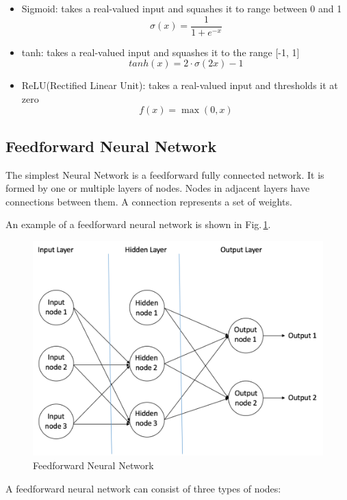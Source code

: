 \begin{itemize}
  \item Sigmoid: takes a real-valued input and squashes it to range between 0 and 1
        $$ \sigma(x) =  \frac{\mathrm{1} }{\mathrm{1} + e^{-x} }  $$ 
  \item tanh: takes a real-valued input and squashes it to the range [-1, 1]
        $$ tanh(x) = 2\cdot\sigma(2x)-1 $$
        
  \item ReLU(Rectified Linear Unit): takes a real-valued input and thresholds it at zero
        $$f(x) = \max(0,x)$$
\end{itemize}

\subsection{Feedforward Neural Network}

The simplest Neural Network is a feedforward fully connected network. It is formed by one or multiple layers of nodes. Nodes in adjacent layers have connections between them. A connection represents a set of weights.


\noindent An example of a feedforward neural network is shown in Fig.\,\ref{feedforward}.
\begin{figure}[h]
	\centering
	\includegraphics[scale=0.5]{Figs/feedforward.png}
    \caption{Feedforward Neural Network}
    \label{feedforward}
\end{figure}

A feedforward neural network can consist of three types of nodes:

